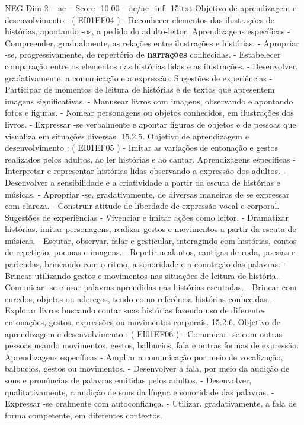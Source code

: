 \begin{textsample}{NEG Dim 2 – ac – Score -10.00 – ac/ac\_inf\_15.txt}
Objetivo de aprendizagem e desenvolvimento : ( EI01EF04 ) - Reconhecer elementos das ilustrações de histórias, apontando -os, a pedido do adulto-leitor.
Aprendizagens específicas - Compreender, gradualmente, as relações entre ilustrações e histórias. - Apropriar -se, progressivamente, de repertório de \textbf{narrações} conhecidas. - Estabelecer comparação entre os elementos das histórias lidas e as ilustrações. - Desenvolver, gradativamente, a comunicação e a expressão.
Sugestões de experiências - Participar de momentos de leitura de histórias e de textos que apresentem imagens significativas. - Manusear livros com imagens, observando e apontando fotos e figuras. - Nomear personagens ou objetos conhecidos, em ilustrações dos livros. - Expressar -se verbalmente e apontar figuras de objetos e de pessoas que visualiza em situações diversas. 15.2.5.
Objetivo de aprendizagem e desenvolvimento : ( EI01EF05 ) - Imitar as variações de entonação e gestos realizados pelos adultos, ao ler histórias e ao cantar.
Aprendizagens específicas - Interpretar e representar histórias lidas observando a expressão dos adultos. - Desenvolver a sensibilidade e a criatividade a partir da escuta de histórias e músicas. - Apropriar -se, gradativamente, de diversas maneiras de se expressar com clareza. - Construir atitude de liberdade de expressão vocal e corporal.
Sugestões de experiências - Vivenciar e imitar ações como leitor. - Dramatizar histórias, imitar personagens, realizar gestos e movimentos a partir da escuta de músicas. - Escutar, observar, falar e gesticular, interagindo com histórias, contos de repetição, poemas e imagens. - Repetir acalantos, cantigas de roda, poesias e parlendas, brincando com o ritmo, a sonoridade e a conotação das palavras. - Brincar utilizando gestos e movimentos nas situações de leitura de história. - Comunicar -se e usar palavras aprendidas nas histórias escutadas. - Brincar com enredos, objetos ou adereços, tendo como referência histórias conhecidas. - Explorar livros buscando contar suas histórias fazendo uso de diferentes entonações, gestos, expressões ou movimentos corporais. 15.2.6.
Objetivo de aprendizagem e desenvolvimento : ( EI01EF06 ) - Comunicar -se com outras pessoas usando movimentos, gestos, balbucios, fala e outras formas de expressão.
Aprendizagens específicas - Ampliar a comunicação por meio de vocalização, balbucios, gestos ou movimentos. - Desenvolver a fala, por meio da audição de sons e pronúncias de palavras emitidas pelos adultos. - Desenvolver, qualitativamente, a audição de sons da língua e sonoridade das palavras. - Expressar -se oralmente com autoconfiança. - Utilizar, gradativamente, a fala de forma competente, em diferentes contextos.

\end{textsample}

